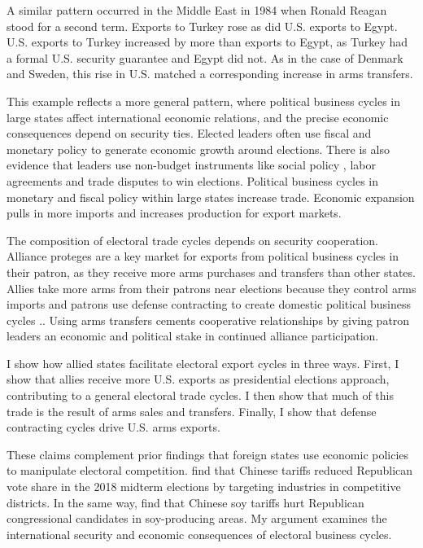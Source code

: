 \documentclass[12pt]{article}
\begin{document}
A similar pattern occurred in the Middle East in 1984 when Ronald Reagan stood for a second term.
Exports to Turkey rose as did U.S. exports to Egypt.
U.S. exports to Turkey increased by more than exports to Egypt, as Turkey had a formal U.S. security guarantee and Egypt did not.
As in the case of Denmark and Sweden, this rise in U.S. matched a corresponding increase in arms transfers. 



This example reflects a more general pattern, where political business cycles in large states affect international economic relations, and the precise economic consequences depend on security ties.
Elected leaders often use fiscal and monetary policy \citep{Nordhaus1975, Tufte1978, Rogoff1987, ClarkHallerberg2000} to generate economic growth around elections. 
There is also evidence that leaders use non-budget instruments like social policy \citep{Philips2020}, labor agreements \citep{Ahlquist2010} and trade disputes \citep{Conconietal2017} to win elections. 
Political business cycles in monetary and fiscal policy within large states increase trade. 
Economic expansion pulls in more imports and increases production for export markets. 


The composition of electoral trade cycles depends on security cooperation. 
Alliance proteges are a key market for exports from political business cycles in their patron, as they receive more arms purchases and transfers than other states. 
Allies take more arms from their patrons near elections because they control arms imports and patrons use defense contracting to create domestic political business cycles \citep{Tufte1978, Mintz1988, Mayer1995, DerouenHeo2000, Becker2021}.. 
Using arms transfers cements cooperative relationships by giving patron leaders an economic and political stake in continued alliance participation.


I show how allied states facilitate electoral export cycles in three ways. 
First, I show that allies receive more U.S. exports as presidential elections approach, contributing to a general electoral trade cycles.
I then show that much of this trade is the result of arms sales and transfers.  
Finally, I show that defense contracting cycles drive U.S. arms exports. 


These claims complement prior findings that foreign states use economic policies to manipulate electoral competition. 
\citet{KimMargalit2021} find that Chinese tariffs reduced Republican vote share in the 2018 midterm elections by targeting industries in competitive districts.
In the same way, \cite{ChyzhUrbatsch2021} find that Chinese soy tariffs hurt Republican congressional candidates in soy-producing areas. 
My argument examines the international security and economic consequences of electoral business cycles.
\end{document}
